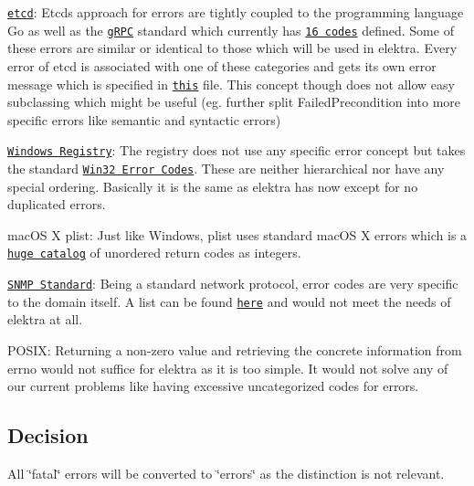 \begin{DoxyItemize}
\item \href{https://github.com/etcd-io/etcd}{\tt etcd}\+: Etcd\textquotesingle{}s approach for errors are tightly coupled to the programming language Go as well as the \href{https://grpc.io/}{\tt g\+R\+PC} standard which currently has \href{https://godoc.org/google.golang.org/grpc/codes}{\tt 16 codes} defined. Some of these errors are similar or identical to those which will be used in elektra. Every error of etcd is associated with one of these categories and gets its own error message which is specified in \href{https://github.com/etcd-io/etcd/blob/master/etcdserver/api/v3rpc/rpctypes/error.go}{\tt this} file. This concept though does not allow easy subclassing which might be useful (eg. further split Failed\+Precondition into more specific errors like semantic and syntactic errors)
\item \href{https://docs.microsoft.com/en-us/windows/desktop/sysinfo/registry}{\tt Windows Registry}\+: The registry does not use any specific error concept but takes the standard \href{https://docs.microsoft.com/en-us/openspecs/windows_protocols/ms-erref/18d8fbe8-a967-4f1c-ae50-99ca8e491d2d}{\tt Win32 Error Codes}. These are neither hierarchical nor have any special ordering. Basically it is the same as elektra has now except for no duplicated errors.
\item mac\+OS X plist\+: Just like Windows, plist uses standard mac\+OS X errors which is a \href{http://krypted.com/lists/comprehensive-list-of-mac-os-x-error-codes/}{\tt huge catalog} of unordered return codes as integers.
\item \href{http://www.snmp.com/protocol/}{\tt S\+N\+MP Standard}\+: Being a standard network protocol, error codes are very specific to the domain itself. A list can be found \href{https://docs.microsoft.com/en-us/windows/desktop/snmp/snmp-error-codes}{\tt here} and would not meet the needs of elektra at all.
\item P\+O\+S\+IX\+: Returning a non-\/zero value and retrieving the concrete information from {\ttfamily errno} would not suffice for elektra as it is too simple. It would not solve any of our current problems like having excessive uncategorized codes for errors.
\end{DoxyItemize}

\subsection*{Decision}

All \char`\"{}fatal\char`\"{} errors will be converted to \char`\"{}errors\char`\"{} as the distinction is not relevant.

